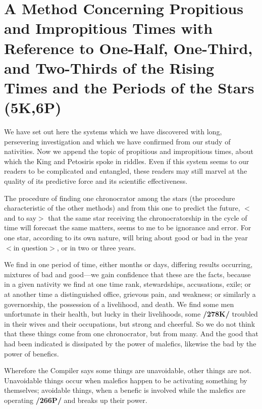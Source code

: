 \section{A Method Concerning Propitious and Impropitious Times with Reference to One-Half, One-Third, and Two-Thirds of the Rising Times and the Periods of the Stars (5K,6P)}

We have set out here the systems which we have discovered with long, persevering investigation and which we have confirmed from our study of nativities. Now we append the topic of propitious and
impropitious times, about which the King and Petosiris spoke in riddles. Even if this system seems to our readers to be complicated and entangled, these readers may still marvel at the quality of its predictive force and its scientific effectiveness. 

The procedure of finding one chronocrator among the stars (the procedure characteristic of the other methods) and from this one to predict the future, $<$and to say$>$ that the same star receiving the chronocratorship in the cycle of time will forecast the same matters, seems to me to be ignorance and error. For one star, according to its own nature, will bring about good or bad in the year $<$in question$>$, or in two or three years. 

We find in one period of time, either months or days, differing results occurring, mixtures of bad and good—we gain confidence that these are the facts, because in a given nativity we find at one time rank, stewardships, accusations, exile; or at another time a distinguished office, grievous pain, and weakness; or similarly a governorship, the possession of a livelihood, and death. We find some men unfortunate in their health, but lucky in their livelihoods, some \textbf{/278K/} troubled in their wives and their occupations, but strong and cheerful. So we do not think that these things come from one chronocrator, but from many. And the good that had been indicated is dissipated by the power of malefics, likewise the bad by the power of benefics.

Wherefore the Compiler says some things are unavoidable, other things are not. Unavoidable things occur when malefics happen to be activating something by themselves; avoidable things, when a benefic is involved while the malefics are operating \textbf{/266P/} and breaks up their power. 

